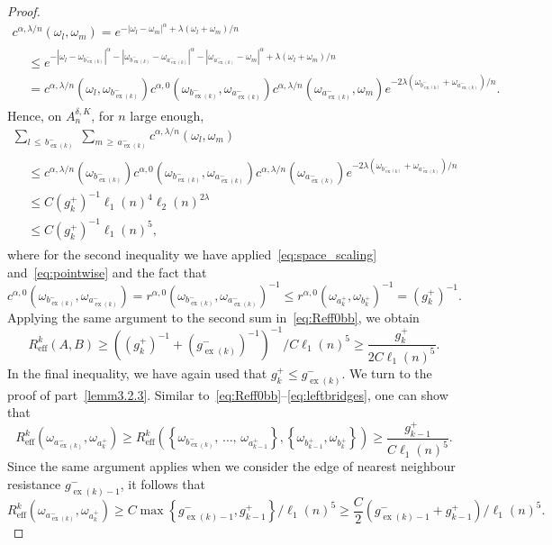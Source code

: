 \documentclass[AHL,Unicode,longabstracts,published]{cedram}
\newcommand{\eff}{\mathrm{eff}}
\newcommand\ex{\operatorname{ex}}
\newcommand{\aat}[1]{a_{\ex(#1)}^-}
\newcommand{\bt}[1]{b_{\ex(#1)}^-}
\newcommand{\gt}[1]{g_{\ex(#1)}^-}
\newcommand{\gtt}[1]{g_{\ex(#1)-1}^-}
\begin{document}
\begin{proof}
\begin{multline*}
c^{\alpha,\lambda/n}(\omega_l,\omega_m)
=e^{-|\omega_l-\omega_m|^\alpha+\lambda(\omega_l+\omega_m)/n}\\
\begin{aligned}
&\leq e^{-|\omega_l-\omega_{\bt{k}}|^\alpha-|\omega_{\bt{k}}-\omega_{\aat{k}}|^\alpha-|\omega_{\aat{k}}-\omega_m|^\alpha+\lambda(\omega_l+\omega_m)/n}\\
&=c^{\alpha,\lambda/n}\left(\omega_l,\omega_{\bt{k}}\right)c^{\alpha,0}\left(\omega_{\bt{k}},\omega_{\aat{k}}\right)c^{\alpha,\lambda/n}\left(\omega_{\aat{k}},\omega_m\right)e^{-2\lambda\left(\omega_{\bt{k}}+\omega_{\aat{k}}\right)/n}.
\end{aligned}
\end{multline*}
Hence, on $A_n^{\delta,K}$, for $n$ large enough,
\begin{multline}\label{eq:leftbridges}
{\textstyle \sum_{l\,\leq\,\bt{k}}\;\sum_{m\,\geq\,\aat{k}}}c^{\alpha,\lambda/n}\left(\omega_l,\omega_m\right)\\
\begin{aligned}
&\leq c^{\alpha,\lambda/n}\left(\omega_{\bt{k}}\right)c^{\alpha,0}\left(\omega_{\bt{k}},\omega_{\aat{k}}\right)c^{\alpha,\lambda/n}\left(\omega_{\aat{k}}\right)e^{-2\lambda\left(\omega_{\bt{k}}+\omega_{\aat{k}}\right)/n}\\
&\leq C\left(g_k^+\right)^{-1}\ell_1(n)^4{\ell_2(n)^{2\lambda}}\\
&\leq C\left(g_k^+\right)^{-1}\ell_1(n)^5,
\end{aligned}
\end{multline}
where for the second inequality we have applied~\eqref{eq:space_scaling} and~\eqref{eq:pointwise} and the fact that
\[
c^{\alpha,0}\left(\omega_{\bt{k}},\omega_{\aat{k}}\right)=r^{\alpha,0}\left(\omega_{\bt{k}},\omega_{\aat{k}}\right)^{-1}\leq r^{\alpha,0}\left(\omega_{{a}_k^+},\omega_{{b}_k^+}\right)^{-1}=(g_k^+)^{-1}.
\]
Applying the same argument to the second sum in~\eqref{eq:Reff0bb}, we obtain
\[
R^{k}_{\eff}\left(A,B\right)\ge \left(\left(g_{k}^+\right)^{-1}+\left(\gt{k}\right)^{-1}\right)^{-1}/{C\ell_1(n)^5}\ge \frac{g_{k}^+}{2C\ell_1(n)^5}.
\]
In the final inequality, we have again used that $g_k^+\leq \gt{k}$. We turn to the proof of part~\eqref{lemm3.2.3}. Similar to~\eqref{eq:Reff0bb}--\eqref{eq:leftbridges}, one can show that
\[
R^k_{\eff}\left(\omega_{\aat{k}},{\omega_{a_k^+}}\right)\geq R^k_{\eff}\left(
\left\{\omega_{\bt{k}},\,\dots,\,\omega_{{a}_{k-1}^+}\right\},\left\{\omega_{b_{k-1}^+},\omega_{b_k^+}\right\}\right)\geq \frac{g_{k-1}^+}{C\ell_1(n)^5}.
\]
Since the same argument applies when we consider the edge of nearest neighbour resistance $\gtt{k}$, it follows that
\[
R^k_{\eff}\left(\omega_{\aat{k}},{\omega_{a_k^+}}\right)\geq C \max
\left\{\gtt{k},g_{k-1}^+\right\}/\ell_1(n)^5\geq \frac C2 \left(\gtt{k}+g_{k-1}^+\right)/ \ell_1(n)^5.
\]
\end{proof}
\end{document}
